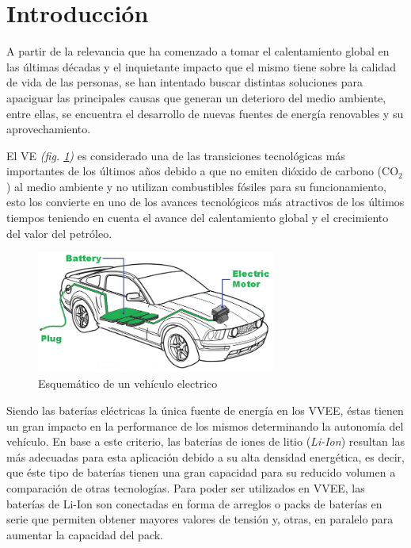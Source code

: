 \documentclass[10pt,a4paper]{article}
\begin{document}
\newpage
\tableofcontents

\newpage

\section{Introducción}

\noindent A partir de la relevancia que ha comenzado a tomar el 
calentamiento global en las últimas décadas y el inquietante impacto que 
el mismo tiene sobre la calidad de vida de las personas, se han intentado 
buscar distintas soluciones para apaciguar las principales causas que 
generan un deterioro del medio ambiente, entre ellas, se encuentra el 
desarrollo de nuevas fuentes de energía renovables y su aprovechamiento.

\noindent El \acrfull{VE} \emph{(fig. \ref{EV})} es considerado 
una de las transiciones tecnológicas más importantes de los últimos años 
debido a que no emiten dióxido de carbono ($\mathrm{CO_2}$) al medio 
ambiente y no utilizan combustibles fósiles para su funcionamiento, esto 
los convierte en uno de los avances tecnológicos más atractivos de los 
últimos tiempos teniendo en cuenta el avance del calentamiento global y el 
crecimiento del valor del petróleo.

\begin{figure}[h!]
    \begin{center}
	\includegraphics[width=0.7\textwidth]{EV.png}
	\caption{Esquem\'atico de un veh\'iculo electrico}
	\label{EV}
    \end{center}
\end{figure}

\noindent Siendo las baterías eléctricas la única fuente de energía en los 
\acrfull{VVEE}, éstas tienen un gran impacto en la performance de los mismos 
determinando la autonomía del vehículo. En base a este criterio, las 
baterías de iones de litio (\emph{Li-Ion}) resultan las más adecuadas para 
esta aplicación debido a su alta densidad energética, es decir, que éste 
tipo de baterías tienen una gran capacidad para su reducido volumen a 
comparación de otras tecnologías. Para poder ser utilizados en
\acrshort{VVEE}, las baterías de Li-Ion son conectadas en forma de arreglos 
o packs de baterías en serie que permiten obtener mayores valores de tensión
y, otras, en paralelo para aumentar la capacidad del pack.
\end{document}

